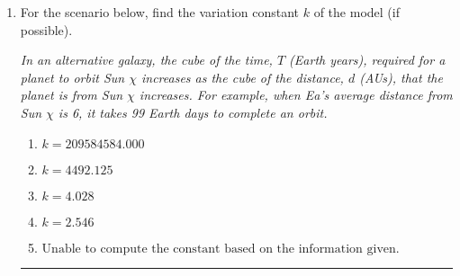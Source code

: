 \documentclass[14pt]{extbook}
\newcommand{\litem}[1]{\item#1\hspace*{-1cm}\rule{\textwidth}{0.4pt}}
\begin{document}
\begin{enumerate}
{\begin{enumerate}[label=\Alph*.]
\end{enumerate} }
\litem{
For the scenario below, find the variation constant $k$ of the model (if possible).
\begin{center}
    \textit{ In an alternative galaxy, the cube of the time, $T$ (Earth years), required for a planet to orbit Sun $\chi$ increases as the cube of the distance, $d$ (AUs), that the planet is from Sun $\chi$ increases. For example, when Ea's average distance from Sun $\chi$ is 6, it takes 99 Earth days to complete an orbit. }
\end{center}
\begin{enumerate}[label=\Alph*.]
\item \( k = 209584584.000 \)
\item \( k = 4492.125 \)
\item \( k = 4.028 \)
\item \( k = 2.546 \)
\item \( \text{Unable to compute the constant based on the information given.} \)

\end{enumerate} }
\end{enumerate}
\end{document}
